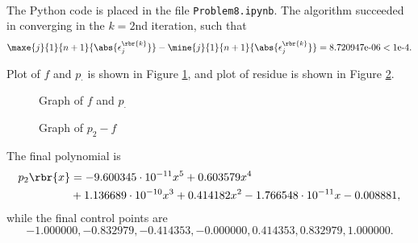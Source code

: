 \documentclass[english, nochinese]{../TeXTemplate/pkupaper}
\begin{document}
\begin{thmquestion}
\ 
\begin{thmanswer}
The Python code is placed in the file \verb"Problem8.ipynb". The algorithm succeeded in converging in the $ k = 2 $nd iteration, such that
\begin{equation}
\maxe{j}{1}{ n + 1 }{\abs{\epsilon^{\rbr{k}}_j}} - \mine{j}{1}{ n + 1 }{\abs{\epsilon^{\rbr{k}}_j}} = \text{8.720947e-06} < \text{1e-4}.
\end{equation}
\end{thmanswer}
Plot of $f$ and $p_{\cdot}$ is shown in Figure \ref{Fig:Origin}, and plot of residue is shown in Figure \ref{Fig:Residue}.
\begin{figure}[htbp]
\centering \scalebox{0.8}{}
\caption{Graph of $f$ and $p_{\cdot}$} \label{Fig:Origin}
\end{figure}
\begin{figure}[htbp]
\centering \scalebox{0.8}{}
\caption{Graph of $ p_2 - f $} \label{Fig:Residue}
\end{figure}
The final polynomial is
\begin{equation}
\begin{split}
p_2 \rbr{x} &= - 9.600345 \cdot 10^{-11} x^{5} + 0.603579 x^{4} \\
&+ 1.136689 \cdot 10^{-10} x^{3} + 0.414182 x^{2} - 1.766548 \cdot 10^{-11} x - 0.008881,
\end{split}
\end{equation}
while the final control points are
\begin{equation}
-1.000000, -0.832979, -0.414353, -0.000000, 0.414353, 0.832979, 1.000000.
\end{equation}
\end{thmquestion}
\end{document}
